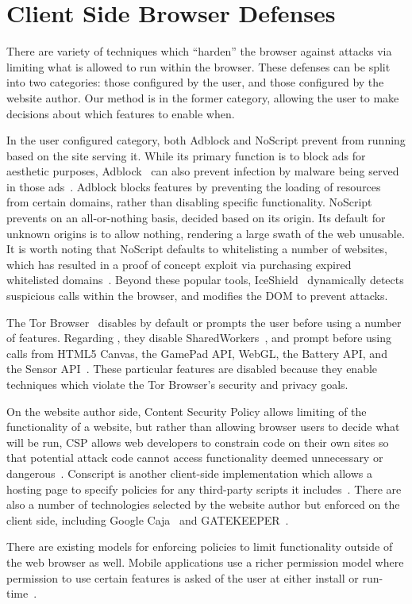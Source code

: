 \section{Client Side Browser Defenses}
\label{background:related-browser-defs}

There are variety of techniques which ``harden'' the browser against attacks
via limiting what \JS is allowed to run within the browser. These defenses can
be split into two categories: those configured by the user, and those
configured by the website author. Our method is in the former category,
allowing the user to make decisions about which features to enable when.

In the user configured category, both Adblock and NoScript prevent \JS from
running based on the site serving it.  While its primary function is to block
ads for aesthetic purposes, Adblock~\cite{adblockplus} can also prevent
infection by malware being served in those
ads~\cite{forbes-malware,engadget-malware}.  Adblock blocks \JS features by
preventing the loading of resources from certain domains, rather than disabling
specific functionality.  NoScript~\cite{noscriptwebsite} prevents \JS on an
all-or-nothing basis, decided based on its origin.  Its default for unknown
origins is to allow nothing, rendering a large swath of the web unusable.  It
is worth noting that NoScript defaults to whitelisting a number of websites,
which has resulted in a proof of concept exploit via purchasing expired
whitelisted domains~\cite{noscript_whitelist}.  Beyond these popular tools,
IceShield~\cite{heiderich2011iceshield}  dynamically detects suspicious \JS
calls within the browser, and modifies the DOM to prevent attacks.

The Tor Browser~\cite{dingledine2004tor} disables by default or prompts the
user before using a number of features.  Regarding \JS, they disable
SharedWorkers~\cite{webworkersw3c}, and prompt before using calls from HTML5
Canvas, the GamePad API, WebGL, the Battery API, and the Sensor
API~\cite{tor-features}.  These particular features are disabled because they
enable techniques which violate the Tor Browser's security and privacy goals.

On the website author side, Content Security Policy allows limiting of the
functionality of a website, but rather than allowing browser users to decide
what will be run, CSP allows web developers to constrain code on their own
sites so that potential attack code cannot access functionality deemed
unnecessary or dangerous~\cite{stamm2010reining}.  Conscript is another
client-side implementation which allows a hosting page to specify policies for
any third-party scripts it includes~\cite{meyerovich2010conscript}.  There are
also a number of technologies selected by the website author but enforced on
the client side,  including Google Caja~\cite{google13caja} and
GATEKEEPER~\cite{guarnieri09gatekeeper}.

There are existing models for enforcing policies to limit functionality outside
of the web browser as well.  Mobile applications use a richer permission model
where permission to use certain features is asked of the user at either install
or run-time~\cite{android-permissions,au2011short}.
